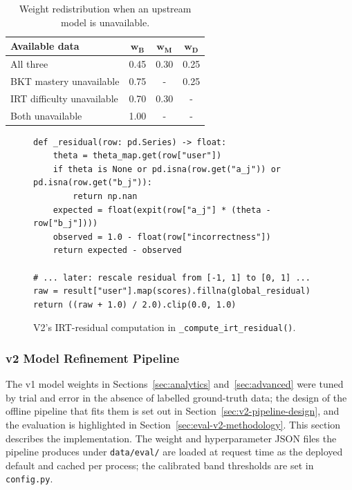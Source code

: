 \begin{table}[H]
\centering
\caption{Weight redistribution when an upstream model is unavailable.}
\label{tab:improved-redist}
\small
\begin{tabular}{|l|c|c|c|}
\hline
\textbf{Available data} & $\boldsymbol{w_B}$ & $\boldsymbol{w_M}$ & $\boldsymbol{w_D}$ \\
\hline\hline
All three                 & 0.45 & 0.30 & 0.25 \\
\hline
BKT mastery unavailable   & 0.75 & -  & 0.25 \\
\hline
IRT difficulty unavailable & 0.70 & 0.30 & -  \\
\hline
Both unavailable          & 1.00 & -  & -  \\
\hline
\end{tabular}
\end{table}

\begin{figure}[H]
    \centering
    \begin{minipage}{0.92\linewidth}
\begin{lstlisting}[firstnumber=336]
def _residual(row: pd.Series) -> float:
    theta = theta_map.get(row["user"])
    if theta is None or pd.isna(row.get("a_j")) or pd.isna(row.get("b_j")):
        return np.nan
    expected = float(expit(row["a_j"] * (theta - row["b_j"])))
    observed = 1.0 - float(row["incorrectness"])
    return expected - observed

# ... later: rescale residual from [-1, 1] to [0, 1] ...
raw = result["user"].map(scores).fillna(global_residual)
return ((raw + 1.0) / 2.0).clip(0.0, 1.0)
\end{lstlisting}
    \end{minipage}
    \caption{V2's IRT-residual computation in \texttt{\_compute\_irt\_residual()}.}
    \label{fig:code-irt-residual}
\end{figure}

\subsubsection{v2 Model Refinement Pipeline} \label{sec:v2-training}

The v1 model weights in Sections~\ref{sec:analytics} and~\ref{sec:advanced} were tuned by trial and error in the absence of labelled ground-truth data; the design of the offline pipeline that fits them is set out in Section~\ref{sec:v2-pipeline-design}, and the evaluation is highlighted in Section~\ref{sec:eval-v2-methodology}.
This section describes the implementation.
The weight and hyperparameter JSON files the pipeline produces under \texttt{data/eval/} are loaded at request time as the deployed default and cached per process; the calibrated band thresholds are set in \texttt{config.py}.

